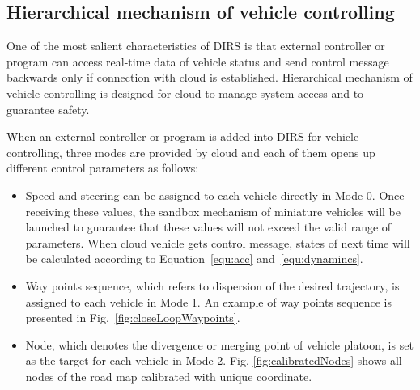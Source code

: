 \documentclass[conference]{IEEEtran}
\begin{document}
\subsection{Hierarchical mechanism of vehicle controlling}
	\label{subsec:access}	
	One of the most salient characteristics of DIRS is that external controller or program can access real-time data of vehicle status and send control message backwards only if connection with cloud is established. Hierarchical mechanism of vehicle controlling is designed for cloud to manage system access and to guarantee safety.
	
	When an external controller or program is added into DIRS for vehicle controlling, three modes are provided by cloud and each of them opens up different control parameters as follows:
	\begin{itemize}
		\item  Speed and steering can be assigned to each vehicle directly in Mode 0. Once receiving these values, the sandbox mechanism of miniature vehicles will be launched to guarantee that these values will not exceed the valid range of parameters. When cloud vehicle gets control message, states of next time will be calculated according to Equation~\ref{equ:acc} and~\ref{equ:dynamincs}.
		\item Way points sequence, which refers to dispersion of the desired trajectory, is assigned to each vehicle in Mode 1. An example of way points sequence is presented in Fig.~\ref{fig:closeLoopWaypoints}.
		\item Node, which denotes the divergence or merging point of vehicle platoon, is set as the target for each vehicle in Mode 2. Fig. \ref{fig:calibratedNodes} shows all nodes of the road map calibrated with unique coordinate.
	\end{itemize}
	
\end{document}

